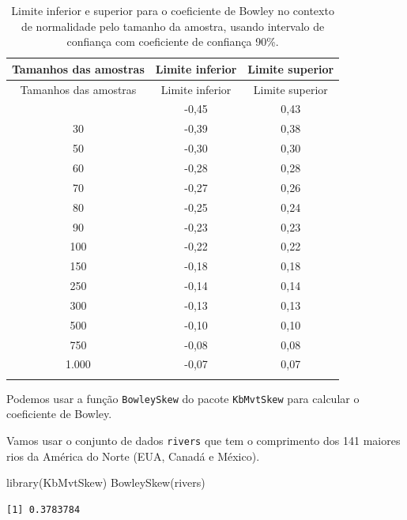 \documentclass[
  10pt,
  ignorenonframetext,
]{beamer}
\newenvironment{Shaded}{\begin{snugshade}}{\end{snugshade}}
\newcommand{\FunctionTok}[1]{\textcolor[rgb]{0.28,0.35,0.67}{#1}}
\newcommand{\NormalTok}[1]{\textcolor[rgb]{0.00,0.23,0.31}{#1}}
\begin{document}
\begin{frame}
\begin{longtable}[]{@{}ccc@{}}
\caption{Limite inferior e superior para o coeficiente de Bowley no
contexto de normalidade pelo tamanho da amostra, usando intervalo de
confiança com coeficiente de confiança 90\%.}\tabularnewline
\toprule\noalign{}
Tamanhos das amostras & Limite inferior & Limite superior \\
\midrule\noalign{}
\endfirsthead
\toprule\noalign{}
Tamanhos das amostras & Limite inferior & Limite superior \\
\midrule\noalign{}
\endhead
25 & -0,45 & 0,43 \\
30 & -0,39 & 0,38 \\
50 & -0,30 & 0,30 \\
60 & -0,28 & 0,28 \\
70 & -0,27 & 0,26 \\
80 & -0,25 & 0,24 \\
90 & -0,23 & 0,23 \\
100 & -0,22 & 0,22 \\
150 & -0,18 & 0,18 \\
250 & -0,14 & 0,14 \\
300 & -0,13 & 0,13 \\
500 & -0,10 & 0,10 \\
750 & -0,08 & 0,08 \\
1.000 & -0,07 & 0,07 \\
\bottomrule\noalign{}
\end{longtable}
\end{frame}

\begin{frame}[fragile]
Podemos usar a função \texttt{BowleySkew} do pacote \texttt{KbMvtSkew}
para calcular o coeficiente de Bowley.

Vamos usar o conjunto de dados \texttt{rivers} que tem o comprimento dos
141 maiores rios da América do Norte (EUA, Canadá e México).

\begin{Shaded}
\begin{Highlighting}[]
\FunctionTok{library}\NormalTok{(KbMvtSkew)}
\FunctionTok{BowleySkew}\NormalTok{(rivers)}
\end{Highlighting}
\end{Shaded}

\begin{verbatim}
[1] 0.3783784
\end{verbatim}
\end{frame}
\end{document}
